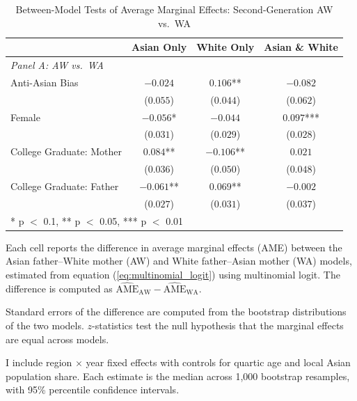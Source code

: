 \documentclass[12pt,english]{article}
\providecommand{\DIFaddtex}[1]{{\protect\color{blue}\uwave{#1}}} %
\providecommand{\DIFaddbegin}{} %
\providecommand{\DIFaddend}{} %
\providecommand{\DIFdelend}{} %
\providecommand{\DIFaddFL}[1]{\DIFadd{#1}} %
\providecommand{\DIFadd}[1]{\texorpdfstring{\DIFaddtex{#1}}{#1}} %
\newcommand{\DIFaddincludegraphics}[2][]{{\color{blue}\fbox{\DIFOincludegraphics[#1]{#2}}}} %
\DeclareRobustCommand{\DIFaddbegin}{\DIFOaddbegin \let\includegraphics\DIFaddincludegraphics} %
\DeclareRobustCommand{\DIFaddend}{\DIFOaddend \let\includegraphics\DIFOincludegraphics} %
\DeclareRobustCommand{\DIFdelend}{\DIFOaddend \let\includegraphics\DIFOincludegraphics} %
\begin{document}
\DIFdelend \DIFaddbegin \begin{table}[H]
\centering
\caption{Between-Model Tests of Average Marginal Effects: Second-Generation AW vs.\ WA \label{tab:between-model-second}}
\centering
\fontsize{10}{12}\selectfont
\begin{threeparttable}
\begin{tabular}[t]{lccc}
\toprule
 & \multicolumn{1}{c}{Asian Only} & \multicolumn{1}{c}{White Only} & \multicolumn{1}{c}{Asian \& White} \\
\cmidrule(l{3pt}r{3pt}){2-2} \cmidrule(l{3pt}r{3pt}){3-3} \cmidrule(l{3pt}r{3pt}){4-4}
\midrule
\multicolumn{4}{l}{\textit{Panel A: AW vs.\ WA}} \\
\addlinespace
Anti-Asian Bias & $-0.024$ & $0.106$** & $-0.082$\\
 & ($0.055$) & ($0.044$) & ($0.062$)\\
\addlinespace
Female & $-0.056$* & $-0.044$ & $0.097$***\\
 & ($0.031$) & ($0.029$) & ($0.028$)\\
\addlinespace
College Graduate: Mother & $0.084$** & $-0.106$** & $0.021$\\
 & ($0.036$) & ($0.050$) & ($0.048$)\\
\addlinespace
College Graduate: Father & $-0.061$** & $0.069$** & $-0.002$\\
 & ($0.027$) & ($0.031$) & ($0.037$)\\
\bottomrule
\multicolumn{4}{l}{\rule{0pt}{1em}* p $<$ 0.1, ** p $<$ 0.05, *** p $<$ 0.01}\\
\end{tabular}
\begin{tablenotes}
\small
\item[\DIFaddFL{1}] \footnotesize{Each cell reports the difference in average marginal effects (AME) between the Asian father--White mother (AW) and White father--Asian mother (WA) models, estimated from equation (\ref{eq:multinomial_logit}) using multinomial logit. The difference is computed as $\widehat{\text{AME}}_{\text{AW}} - \widehat{\text{AME}}_{\text{WA}}$.}
\item[\DIFaddFL{2}] \footnotesize{Standard errors of the difference are computed from the bootstrap distributions of the two models. $z$-statistics test the null hypothesis that the marginal effects are equal across models.}
\item[\DIFaddFL{3}] \footnotesize{I include region $\times$ year fixed effects with controls for quartic age and local Asian population share. Each estimate is the median across 1{,}000 bootstrap resamples, with 95\% percentile confidence intervals.}
\end{tablenotes}
\end{threeparttable}
\end{table}
\DIFaddend 
\end{document}
